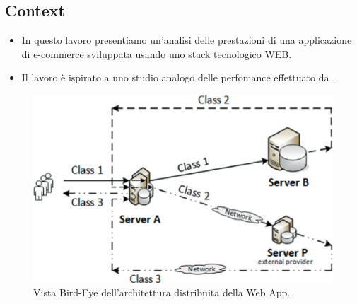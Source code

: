 \subsection{Context}
\begin{frame}{\subsecname}
    \begin{itemize}
        \item In questo lavoro presentiamo un’analisi delle prestazioni di una applicazione di e-commerce sviluppata usando uno stack tecnologico WEB.
        \item Il lavoro è ispirato a uno studio analogo delle perfomance effettuato da \citet{DBLP:books/sp/Serazzi24}.
    \end{itemize}
\end{frame}
\begin{frame}{\subsecname}
    \begin{figure}
        \centering
        \includegraphics[width=0.8\linewidth]{figs/job_classes.png}
        \caption{Vista Bird-Eye dell'architettura distribuita della Web App. \citep{DBLP:books/sp/Serazzi24}}
        \label{fig:enter-label}
    \end{figure}
\end{frame}
